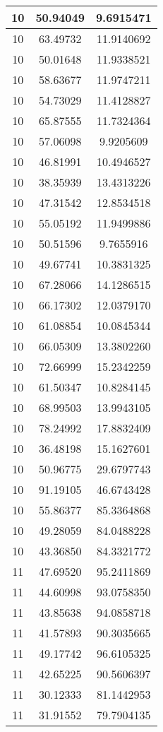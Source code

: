 \documentclass[
]{book}
\begin{document}
\begin{tabular}{c|c|c}
\hline
10 & 50.94049 & 9.6915471\\
\hline
10 & 63.49732 & 11.9140692\\
\hline
10 & 50.01648 & 11.9338521\\
\hline
10 & 58.63677 & 11.9747211\\
\hline
10 & 54.73029 & 11.4128827\\
\hline
10 & 65.87555 & 11.7324364\\
\hline
10 & 57.06098 & 9.9205609\\
\hline
10 & 46.81991 & 10.4946527\\
\hline
10 & 38.35939 & 13.4313226\\
\hline
10 & 47.31542 & 12.8534518\\
\hline
10 & 55.05192 & 11.9499886\\
\hline
10 & 50.51596 & 9.7655916\\
\hline
10 & 49.67741 & 10.3831325\\
\hline
10 & 67.28066 & 14.1286515\\
\hline
10 & 66.17302 & 12.0379170\\
\hline
10 & 61.08854 & 10.0845344\\
\hline
10 & 66.05309 & 13.3802260\\
\hline
10 & 72.66999 & 15.2342259\\
\hline
10 & 61.50347 & 10.8284145\\
\hline
10 & 68.99503 & 13.9943105\\
\hline
10 & 78.24992 & 17.8832409\\
\hline
10 & 36.48198 & 15.1627601\\
\hline
10 & 50.96775 & 29.6797743\\
\hline
10 & 91.19105 & 46.6743428\\
\hline
10 & 55.86377 & 85.3364868\\
\hline
10 & 49.28059 & 84.0488228\\
\hline
10 & 43.36850 & 84.3321772\\
\hline
11 & 47.69520 & 95.2411869\\
\hline
11 & 44.60998 & 93.0758350\\
\hline
11 & 43.85638 & 94.0858718\\
\hline
11 & 41.57893 & 90.3035665\\
\hline
11 & 49.17742 & 96.6105325\\
\hline
11 & 42.65225 & 90.5606397\\
\hline
11 & 30.12333 & 81.1442953\\
\hline
11 & 31.91552 & 79.7904135\\

\end{tabular}
\end{document}
